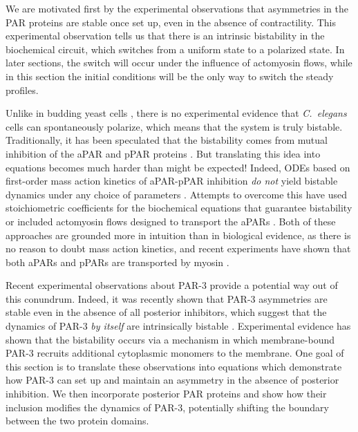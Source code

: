 \documentclass[11pt]{article}
\newcommand{\6}[1]{#1_{\text{6}}}
\newcommand{\3}[1]{#1_{\text{3}}}
\begin{document}
We are motivated first by the experimental observations that asymmetries in the PAR proteins are stable once set up, even in the absence of contractility. This experimental observation tells us that there is an intrinsic bistability in the biochemical circuit, which switches from a uniform state to a polarized state. In later sections, the switch will occur under the influence of actomyosin flows, while in this section the initial conditions will be the only way to switch the steady profiles.

Unlike in budding yeast cells \cite{mogilner2012cell}, there is no experimental evidence that \emph{C.\ elegans} cells can spontaneously polarize, which means that the system is truly bistable. Traditionally, it has been speculated that the bistability comes from mutual inhibition of the aPAR and pPAR proteins \cite{halatek2018self, trong2014parameter}. But translating this idea into equations becomes much harder than might be expected! Indeed, ODEs based on first-order mass action kinetics of aPAR-pPAR inhibition \emph{do not} yield bistable dynamics under any choice of parameters \cite{dawes20113}. Attempts to overcome this have used stoichiometric coefficients for the biochemical equations that guarantee bistability \cite{goehring2011polarization, gross2019guiding} or included actomyosin flows designed to transport the aPARs \cite{TH2008}. Both of these approaches are grounded more in intuition than in biological evidence, as there is no reason to doubt mass action kinetics, and recent experiments have shown that both aPARs and pPARs are transported by myosin \cite{illukkumbura2023design}. 

Recent experimental observations about PAR-3 provide a potential way out of this conundrum. Indeed, it was recently shown that PAR-3 asymmetries are stable even in the absence of all posterior inhibitors, which suggest that the dynamics of PAR-3 \emph{by itself} are intrinsically bistable \cite{lang2023oligomerization}. Experimental evidence has shown that the bistability occurs via a mechanism in which membrane-bound PAR-3 recruits additional cytoplasmic monomers to the membrane. One goal of this section is to translate these observations into equations which demonstrate how PAR-3 can set up and maintain an asymmetry in the absence of posterior inhibition. We then incorporate posterior PAR proteins and show how their inclusion modifies the dynamics of PAR-3, potentially shifting the boundary between the two protein domains. 
\end{document}
